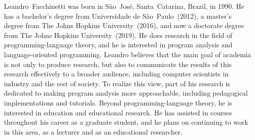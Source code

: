 \documentclass[12pt, oneside]{book}
\begin{document}
Leandro~Facchinetti was born in São~José, Santa~Catarina, Brazil, in 1990. He has a bachelor’s degree from Universidade de São~Paulo~(2012), a master’s degree from The Johns Hopkins University~(2016), and now a doctorate degree from The Johns Hopkins University~(2019). He does research in the field of programming-language theory, and he is interested in program analysis and language-oriented programming. Leandro believes that the main goal of academia is not only to produce research, but also to communicate the results of this research effectively to a broader audience, including computer scientists in industry and the rest of society. To realize this view, part of his research is dedicated to making program analysis more approachable, including pedagogical implementations and tutorials. Beyond programming-language theory, he is interested in education and educational research. He has assisted in courses throughout his career as a graduate student, and he plans on continuing to work in this area, as a lecturer and as an educational researcher.
\end{document}
